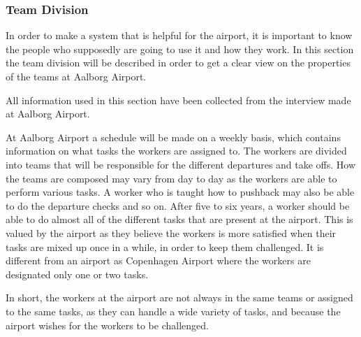 \subsubsection{Team Division}
In order to make a system that is helpful for the airport, it is important to know the people who supposedly are going to use it and how they work. In this section the team division will be described in order to get a clear view on the properties of the teams at Aalborg Airport.

All information used in this section have been collected from the interview made at Aalborg Airport.



At Aalborg Airport a schedule will be made on a weekly basis, which contains information on what tasks the workers are assigned to. The workers are divided into teams that will be responsible for the different departures and take offs. How the teams are composed may vary from day to day as the workers are able to perform various tasks. A worker who is taught how to pushback may also be able to do the departure checks and so on. After five to six years, a worker should be able to do almost all of the different tasks that are present at the airport. This is valued by the airport as they believe the workers is more satisfied when their tasks are mixed up once in a while, in order to keep them challenged. It is different from an airport as Copenhagen Airport where the workers are designated only one or two tasks.  


In short, the workers at the airport are not always in the same teams or assigned to the same tasks, as they can handle a wide variety of tasks, and because the airport wishes for the workers to be challenged.